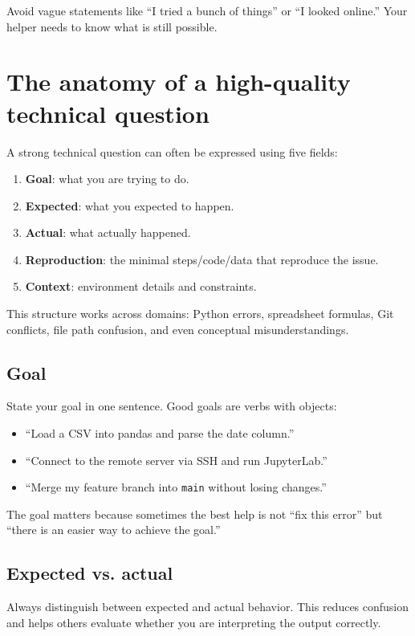 Avoid vague statements like ``I tried a bunch of things'' or ``I looked online.'' Your helper needs to know what is still possible.

\section{The anatomy of a high-quality technical question}
A strong technical question can often be expressed using five fields:
\begin{enumerate}[noitemsep]
  \item \textbf{Goal}: what you are trying to do.
  \item \textbf{Expected}: what you expected to happen.
  \item \textbf{Actual}: what actually happened.
  \item \textbf{Reproduction}: the minimal steps/code/data that reproduce the issue.
  \item \textbf{Context}: environment details and constraints.
\end{enumerate}

This structure works across domains: Python errors, spreadsheet formulas, Git conflicts, file path confusion, and even conceptual misunderstandings.

\subsection{Goal}
State your goal in one sentence. Good goals are verbs with objects:
\begin{itemize}[noitemsep]
  \item ``Load a CSV into pandas and parse the date column.''
  \item ``Connect to the remote server via SSH and run JupyterLab.''
  \item ``Merge my feature branch into \texttt{main} without losing changes.''
\end{itemize}

The goal matters because sometimes the best help is not ``fix this error'' but ``there is an easier way to achieve the goal.''

\subsection{Expected vs. actual}
Always distinguish between expected and actual behavior. This reduces confusion and helps others evaluate whether you are interpreting the output correctly.

